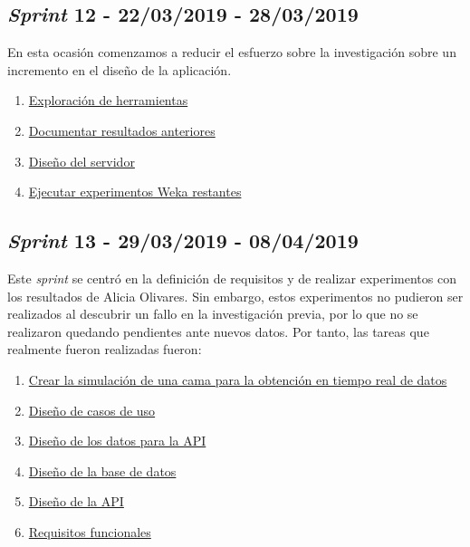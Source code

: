 \subsection{\textit{Sprint} 12 - 22/03/2019 - 28/03/2019}
En esta ocasión comenzamos a reducir el esfuerzo sobre la investigación sobre un incremento en el diseño de la aplicación.

\begin{enumerate}\addtocounter{enumi}{45}
	\item
	\href{https://github.com/joselucross/TFG-SmartBeds/issues/46}{Exploración de herramientas}
	\item
	\href{https://github.com/joselucross/TFG-SmartBeds/issues/47}{Documentar resultados anteriores}
	\item
	\href{https://github.com/joselucross/TFG-SmartBeds/issues/48}{Diseño del servidor}
	\item
	\href{https://github.com/joselucross/TFG-SmartBeds/issues/49}{Ejecutar experimentos Weka restantes}
\end{enumerate}

\subsection{\textit{Sprint} 13 - 29/03/2019 - 08/04/2019}
Este \textit{sprint} se centró en la definición de requisitos y de realizar experimentos con los resultados de Alicia Olivares. Sin embargo, estos experimentos no pudieron ser realizados al descubrir un fallo en la investigación previa, por lo que no se realizaron quedando pendientes ante nuevos datos. Por tanto, las tareas que realmente fueron realizadas fueron:

\begin{enumerate}\addtocounter{enumi}{49}
	\item
	\href{https://github.com/joselucross/TFG-SmartBeds/issues/50}{Crear la simulación de una cama para la obtención en tiempo real de datos}
	\addtocounter{enumi}{1}
	\item
	\href{https://github.com/joselucross/TFG-SmartBeds/issues/52}{Diseño de casos de uso}
	\item
	\href{https://github.com/joselucross/TFG-SmartBeds/issues/53}{Diseño de los datos para la API}
	\item
	\href{https://github.com/joselucross/TFG-SmartBeds/issues/54}{Diseño de la base de datos}
	\addtocounter{enumi}{2}
	\item
	\href{https://github.com/joselucross/TFG-SmartBeds/issues/56}{Diseño de la API}
	\item
	\href{https://github.com/joselucross/TFG-SmartBeds/issues/57}{Requisitos funcionales}
\end{enumerate} 

